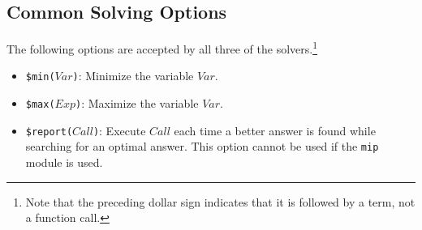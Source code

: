 \subsection{Common Solving Options}
The following options are accepted by all three of the solvers.\footnote{Note that the preceding dollar sign indicates that it is followed by a term, not a function call.}
\begin{itemize}
\item \texttt{\$min($Var$)}: Minimize the variable $Var$.
\item \texttt{\$max($Exp$)}: Maximize the variable $Var$.
\item \texttt{\$report($Call$)}: Execute $Call$ each time a better answer is found while searching for an optimal answer. This option cannot be used if the {\tt mip} module is used.
\end{itemize}

